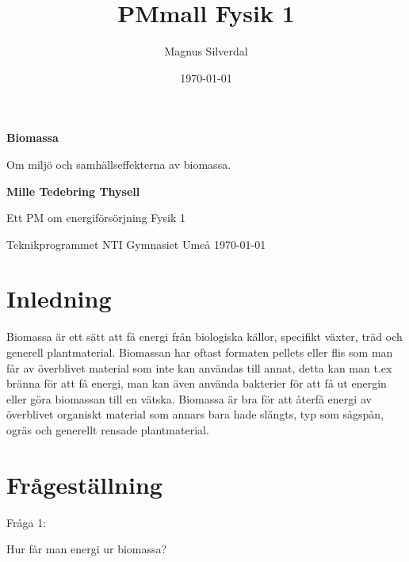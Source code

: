 \documentclass[11p]{article}
\title{PMmall   \small Fysik 1}
\author{Magnus Silverdal }
\date{\today}
\begin{document}
    \begin{titlepage}
        \begin{center}
            \vspace*{1cm}

            \Huge
            \textbf{Biomassa}

            \vspace{0.5cm}
            \LARGE
            Om miljö och samhällseffekterna av biomassa.

            \vspace{1.5cm}

            \textbf{Mille Tedebring Thysell}

            \vfill

            Ett PM om energiförsörjning  
            Fysik 1

            \vspace{0.8cm}


            \Large
            Teknikprogrammet 
            NTI Gymnasiet 
            Umeå 
            \today

        \end{center}
    \end{titlepage}
    \tableofcontents
    \newpage
    \section{Inledning}
    Biomassa är ett sätt att få energi från biologiska källor, specifikt växter, träd och generell plantmaterial.
    Biomassan har oftast formaten pellets eller flis som man får av överblivet material som inte kan användas till
    annat, detta kan man t.ex bränna för att få energi, man kan även använda bakterier för att få ut energin eller
    göra biomassan till en vätska. Biomassa är bra för att återfå energi av överblivet organiskt material som annars
    bara hade slängts, typ som sågspån, ogräs och generellt rensade plantmaterial.  \parencite{wikibiomassa}


    \section{Frågeställning}


     Fråga 1:
      
    
    Hur får man energi ur biomassa?
\end{document}
